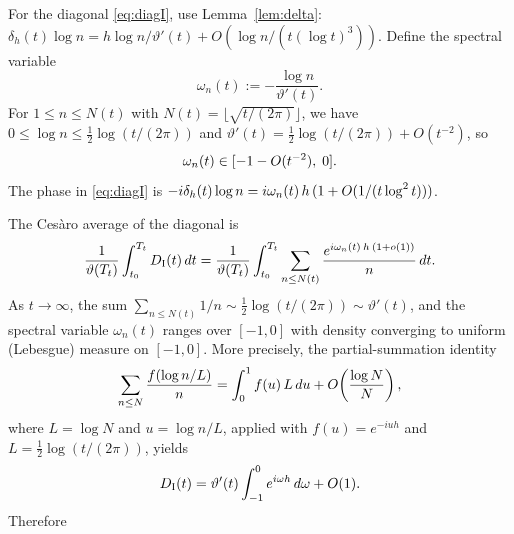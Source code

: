 \documentclass{article}
\newcommand{\assign}{:=}
\begin{document}
For the diagonal \eqref{eq:diagI}, use Lemma~\ref{lem:delta}: $\delta_h (t)
\log n = h \log n / \vartheta' (t) + O (\log n / (t (\log t)^3))$. Define the
spectral variable
\begin{equation}
  \label{eq:omega-def} \omega_n (t) \assign - \frac{\log n}{\vartheta' (t)} .
\end{equation}
For $1 \le n \le N (t)$ with $N (t) = \lfloor \sqrt{t / (2 \pi)} \rfloor$, we
have $0 \le \log n \le \frac{1}{2} \log (t / (2 \pi))$ and $\vartheta' (t) =
\frac{1}{2} \log (t / (2 \pi)) + O (t^{- 2})$, so
\[ \omega_n (t) \in [- 1 - O (t^{- 2}), \hspace{0.27em} 0] . \]
The phase in \eqref{eq:diagI} is $- i \delta_h (t) \log n = i \omega_n (t) 
\hspace{0.17em} h \hspace{0.17em} (1 + O (1 / (t \log^2 t)))$.

The Ces{\`a}ro average of the diagonal is
\begin{equation}
  \label{eq:cesaro-diagI} \frac{1}{\vartheta (T_t)}  \int_{t_0}^{T_t}
  D_{\mathrm{I}} (t)  \hspace{0.17em} dt = \frac{1}{\vartheta (T_t)} 
  \int_{t_0}^{T_t} \sum_{n \le N (t)} \frac{e^{i \omega_n (t)  \hspace{0.17em}
  h \hspace{0.17em} (1 + o (1))}}{n}  \hspace{0.17em} dt.
\end{equation}
As $t \to \infty$, the sum $\sum_{n \le N (t)} 1 / n \sim \frac{1}{2} \log (t
/ (2 \pi)) \sim \vartheta' (t)$, and the spectral variable $\omega_n (t)$
ranges over $[- 1, 0]$ with density converging to uniform (Lebesgue) measure
on $[- 1, 0]$. More precisely, the partial-summation identity
\[ \sum_{n \le N} \frac{f (\log n / L)}{n} = \int_0^1 f (u)  \hspace{0.17em} L
   \hspace{0.17em} du + O \hspace{-0.17em} \left( \frac{\log N}{N} \right), \]
where $L = \log N$ and $u = \log n / L$, applied with $f (u) = e^{- iuh}$ and
$L = \frac{1}{2} \log (t / (2 \pi))$, yields
\[ D_{\mathrm{I}} (t) = \vartheta' (t)  \int_{- 1}^0 e^{i \omega h} 
   \hspace{0.17em} d \omega + O (1) . \]
Therefore
\end{document}
